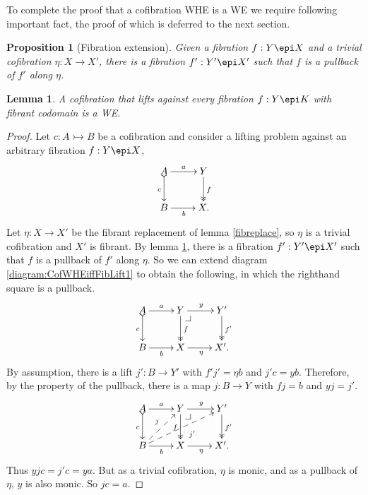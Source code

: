 \documentclass[11pt]{article}
\makeatletter
\newcommand{\pbcorner}[1][dr]{\save*!/#1-1.2pc/#1:(-1,1)@^{|-}\restore}
\newcommand{\mono}{\ensuremath{\rightarrowtail}}
\newcommand{\ra}{\ensuremath{\rightarrow}}
\newtheorem{proposition}[theorem]{Proposition}
\newtheorem{lemma}[theorem]{Lemma}
\theoremstyle{remark}
\theoremstyle{definition}
\makeatother
\begin{document}
To complete the proof that a cofibration WHE is a WE we require following important fact, the proof of which is deferred to the next section.

\begin{proposition}[Fibration extension]\label{lemma:fibextreplace}
Given a fibration $ f : Y \epi X$ and a trivial cofibration $\eta: X\ra X'$,
there is a fibration $f' : Y' \epi X'$ such that $f$ is a pullback of $f'$ along $\eta$. 
\end{proposition}

\begin{lemma}\label{lemma:CofWEiffFibLift}
A cofibration that lifts against every fibration $f : Y\epi K$ with fibrant codomain is a WE.
\end{lemma}

\begin{proof}
Let $c : A\mono B$ be a cofibration and consider a lifting problem against an arbitrary fibration $f: Y\epi X$,
\begin{equation}\label{diagram:CofWHEiffFibLift1}
\xymatrix{
A \ar@{>->}[d]_{c} \ar[r]^-{a}  & Y \ar@{>>}[d]^{f} \\
B \ar[r]_{b} &  X.
}
\end{equation}
Let $\eta: X\ra X'$ be the fibrant replacement of lemma \ref{fibreplace}, so $\eta$ is a trivial cofibration and $X'$ is fibrant. 
By lemma \ref{lemma:fibextreplace}, there is a fibration $f' : Y' \epi X'$ such that $f$ is a pullback of $f'$ along $\eta$. So we can extend diagram \eqref{diagram:CofWHEiffFibLift1} to obtain the following, in which the righthand square is a pullback.
\begin{equation}\label{diagram:CofWHEiffFibLift2}
\xymatrix{
A \ar@{>->}[d]_{c} \ar[r]^-{a}  & Y \ar@{>>}[d]^{f} {\pbcorner} \ar[r]^{y} & Y' \ar@{>>}[d]^{f'} \\
B \ar[r]_{b} &  X  \ar[r]_\eta &  X'.
}
\end{equation}
By assumption, there is a lift $j' : B\ra Y'$ with $f' j' = \eta b$ and $j'c = yb$.  Therefore, by the property of the pullback, there is a map $j : B\ra Y$ with $fj = b$ and $y j = j'$.  
\begin{equation}\label{diagram:CofWHEiffFibLift2}
\xymatrix{
A \ar@{>->}[d]_{c} \ar[r]^-{a}  & Y \ar@{>>}[d]_{f} {\pbcorner} \ar[r]^{y} & Y' \ar@{>>}[d]^{f'} \\
B \ar[r]_{b} \ar@{-->}[ru]^{j} \ar@{-->}[rru]_{\quad j'} &  X  \ar[r]_\eta &  X'.
}
\end{equation}
Thus $yjc = j'c = ya$.  But as a trivial cofibration, $\eta$ is monic, and as a pullback of $\eta$, $y$ is also monic. So $jc=a$.
\end{proof}
\end{document}
